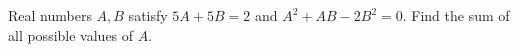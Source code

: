 Real numbers $ A,B $ satisfy $ 5A+5B=2 $ and $ A^2+AB-2B^2=0 $. Find the sum of all possible values of $ A $.
